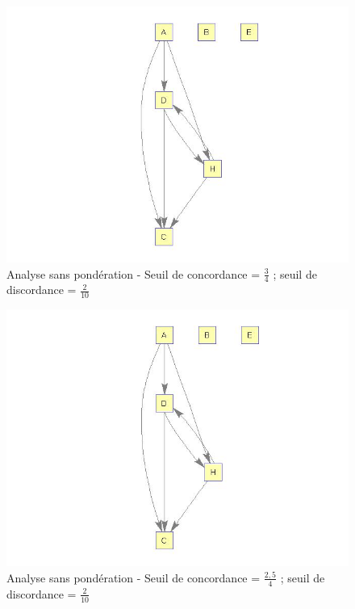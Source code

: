 \documentclass[a4paper,10pt]{article}
\begin{document}
\begin{figure}[H]
\begin{center}
\includegraphics[scale=0.3]{img/G3-neutre.jpg}
\caption{Analyse sans pondération - Seuil de concordance = $\frac{3}{4}$ ; seuil de discordance = $\frac{2}{10}$}
\end{center}
\end{figure}

\begin{figure}[H]
\begin{center}
\includegraphics[scale=0.3]{img/G4-neutre.jpg}
\caption{Analyse sans pondération - Seuil de concordance = $\frac{2,5}{4}$ ; seuil de discordance = $\frac{2}{10}$}
\end{center}
\end{figure}
\end{document}
